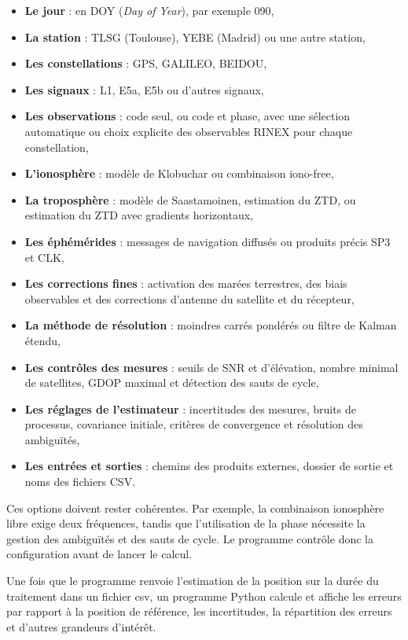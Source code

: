 \begin{itemize}
    \item \textbf{Le jour} : en DOY (\emph{Day of Year}), par exemple 090,
    \item \textbf{La station} : TLSG (Toulouse), YEBE (Madrid) ou une autre station,
    \item \textbf{Les constellations} : GPS, GALILEO, BEIDOU,
    \item \textbf{Les signaux} : L1, E5a, E5b ou d'autres signaux,
    \item \textbf{Les observations} : code seul, ou code et phase, avec une sélection
    automatique ou choix explicite des observables RINEX pour chaque
    constellation,
    \item \textbf{L'ionosphère} : modèle de Klobuchar ou combinaison iono-free,
    \item \textbf{La troposphère} : modèle de Saastamoinen, estimation du ZTD, ou
    estimation du ZTD avec gradients horizontaux,
    \item \textbf{Les éphémérides} : messages de navigation diffusés ou produits
    précis SP3 et CLK,
    \item \textbf{Les corrections fines} : activation des marées terrestres, des
    biais observables et des corrections d'antenne du satellite et du
    récepteur,
    \item \textbf{La méthode de résolution} : moindres carrés pondérés ou filtre de Kalman étendu,
    \item \textbf{Les contrôles des mesures} : seuils de SNR et d'élévation, nombre
    minimal de satellites, GDOP maximal et détection des sauts de cycle,
    \item \textbf{Les réglages de l'estimateur} : incertitudes des mesures, bruits
    de processus, covariance initiale, critères de convergence et résolution
    des ambiguïtés,
    \item \textbf{Les entrées et sorties} : chemins des produits externes, dossier
    de sortie et noms des fichiers CSV.
\end{itemize}

Ces options doivent rester cohérentes. Par exemple, la combinaison ionosphère
libre exige deux fréquences, tandis que l'utilisation de la phase nécessite la
gestion des ambiguïtés et des sauts de cycle. Le programme contrôle donc la
configuration avant de lancer le calcul.

Une fois que le programme renvoie l'estimation de la position sur la durée du traitement dans un fichier csv,
un programme Python calcule et affiche les erreurs par rapport à la position de
référence, les incertitudes, la répartition des erreurs et d'autres grandeurs
d'intérêt.

